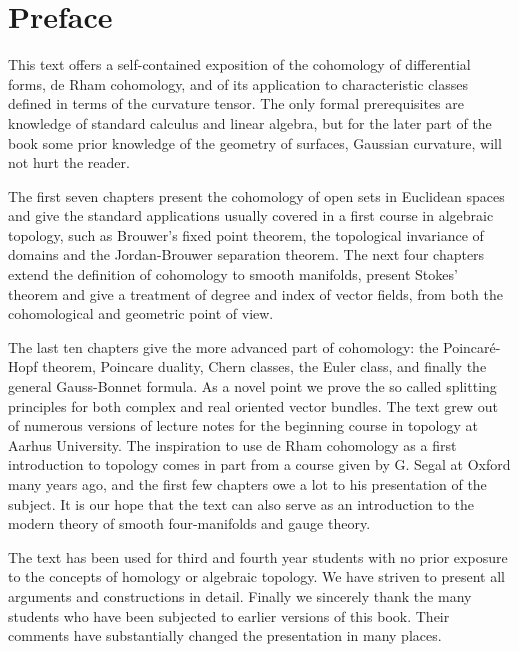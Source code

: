 \chapter*{Preface}
{}

This text offers a self-contained exposition of the cohomology of differential
forms, de Rham cohomology, and of its application to characteristic classes
defined in terms of the curvature tensor. The only formal prerequisites are knowledge 
of standard calculus and linear algebra, but for the later part of the
book some prior knowledge of the geometry of surfaces, Gaussian curvature, will
not hurt the reader.

The first seven chapters present the cohomology of open sets in Euclidean spaces
and give the standard applications usually covered in a first course in algebraic
topology, such as Brouwer's fixed point theorem, the topological invariance of
domains and the Jordan-Brouwer separation theorem. The next four chapters
extend the definition of cohomology to smooth manifolds, present Stokes' theorem 
and give a treatment of degree and index of vector fields, from both the cohomological 
and geometric point of view. 

The last ten chapters give the more advanced part of cohomology:
the Poincar\'{e}-Hopf theorem, Poincare duality, Chern classes, the Euler class, and
finally the general Gauss-Bonnet formula. As a novel point we prove the so
called splitting principles for both complex and real oriented vector bundles.
The text grew out of numerous versions of lecture notes for the beginning course
in topology at Aarhus University. The inspiration to use de Rham cohomology as
a first introduction to topology comes in part from a course given by G. Segal at
Oxford many years ago, and the first few chapters owe a lot to his presentation
of the subject. It is our hope that the text can also serve as an introduction to the
modern theory of smooth four-manifolds and gauge theory.

The text has been used for third and fourth year students with no prior exposure
to the concepts of homology or algebraic topology. We have striven to present
all arguments and constructions in detail. Finally we sincerely thank the many
students who have been subjected to earlier versions of this book. Their comments
have substantially changed the presentation in many places.

\vspace*{2em}
\newpage